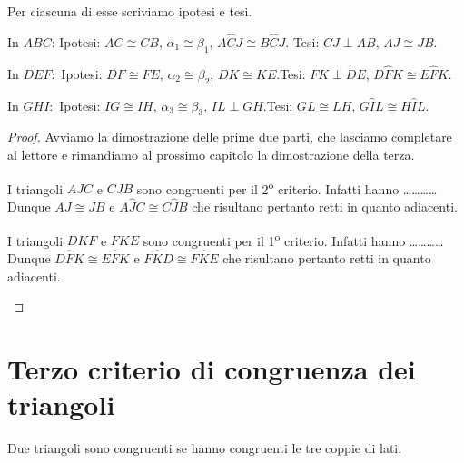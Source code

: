 Per ciascuna di esse scriviamo ipotesi e tesi.
\begin{enumeratea}
\item In $ABC$:	Ipotesi: $AC\cong CB$, $\alpha_1\cong \beta_1$, $A\widehat{C}J\cong B\widehat{C}J$. Tesi: $CJ\perp AB$, $AJ\cong JB$.
\item In $DEF$:	\,Ipotesi: $DF\cong FE$, $\alpha_2\cong \beta_2$, $DK\cong KE$.\tab Tesi: $FK\perp DE$, $D\widehat{F}K\cong E\widehat{F}K$.
\item In $GHI$:	\,Ipotesi: $IG\cong IH$, $\alpha_3\cong \beta_3$, $IL\perp GH$.\tab Tesi: $GL\cong LH$, $G\widehat{I}L\cong H\widehat{I}L$.
\end{enumeratea}

\begin{proof}
Avviamo la dimostrazione delle prime due parti, che lasciamo completare al lettore e rimandiamo al prossimo capitolo la dimostrazione della terza.

\begin{enumeratea}
\item I triangoli $AJC$ e $CJB$ sono congruenti per il 2\textsuperscript{o} criterio. Infatti hanno \ldots\ldots\ldots\ldots{}\\
Dunque $AJ\cong JB$ e $A\widehat{J}C\cong C\widehat{J}B$ che risultano pertanto retti in quanto adiacenti.  
\item I triangoli $DKF$ e $FKE$ sono congruenti per il 1\textsuperscript{o} criterio. Infatti hanno \ldots\ldots\ldots\ldots{}\\
Dunque $D\widehat{F}K\cong E\widehat{F}K$ e $F\widehat{K}D\cong F\widehat{K}E$ che risultano pertanto retti in quanto adiacenti.
\end{enumeratea}
\end{proof}

\section{Terzo criterio di congruenza dei triangoli}\label{sect:terzo_criterio_congruenza_triangoli}

\begin{teorema}
Due triangoli sono congruenti se hanno congruenti le tre coppie di lati.
\end{teorema}

\begin{figure}[htb]
\centering
\end{figure}

